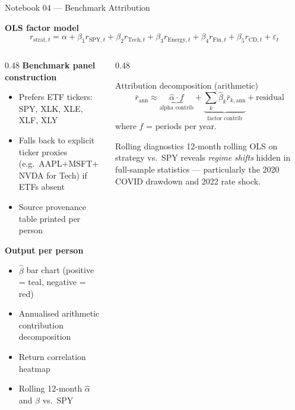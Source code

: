 \documentclass[aspectratio=169, 10pt]{beamer}
\begin{document}
\begin{frame}{Notebook 04 — Benchmark Attribution}

  \textbf{OLS factor model}
  \[
    r_{\text{strat},t} = \alpha
      + \beta_1 r_{\text{SPY},t}
      + \beta_2 r_{\text{Tech},t}
      + \beta_3 r_{\text{Energy},t}
      + \beta_4 r_{\text{Fin},t}
      + \beta_5 r_{\text{CD},t}
      + \varepsilon_t
  \]

  \medskip
  \begin{columns}[T]
    \begin{column}{0.48\textwidth}
      \textbf{Benchmark panel construction}
      \begin{itemize}\small
        \item Prefers ETF tickers: SPY, XLK, XLE, XLF, XLY
        \item Falls back to explicit ticker proxies
          (e.g.\ AAPL+MSFT+NVDA for Tech) if ETFs absent
        \item Source provenance table printed per person
      \end{itemize}

      \bigskip
      \textbf{Output per person}
      \begin{itemize}\small
        \item $\hat{\beta}$ bar chart (positive = teal, negative = red)
        \item Annualised arithmetic contribution decomposition
        \item Return correlation heatmap
        \item Rolling 12-month $\hat{\alpha}$ and $\hat{\beta}$ vs.\ SPY
      \end{itemize}
    \end{column}

    \begin{column}{0.48\textwidth}
      \begin{block}{Attribution decomposition (arithmetic)}
        \small
        \[
          \bar{r}_{\text{ann}}
            \approx \underbrace{\hat{\alpha} \cdot f}_{\text{alpha contrib}}
            + \underbrace{\sum_k \hat{\beta}_k \bar{r}_{k,\text{ann}}}_{\text{factor contrib}}
            + \text{residual}
        \]
        where $f$ = periods per year.
      \end{block}

      \bigskip
      \begin{block}{Rolling diagnostics}
        \small
        12-month rolling OLS on strategy vs.\ SPY reveals
        \emph{regime shifts} hidden in full-sample statistics —
        particularly the 2020 COVID drawdown and 2022 rate shock.
      \end{block}
    \end{column}
  \end{columns}
\end{frame}
\end{document}
